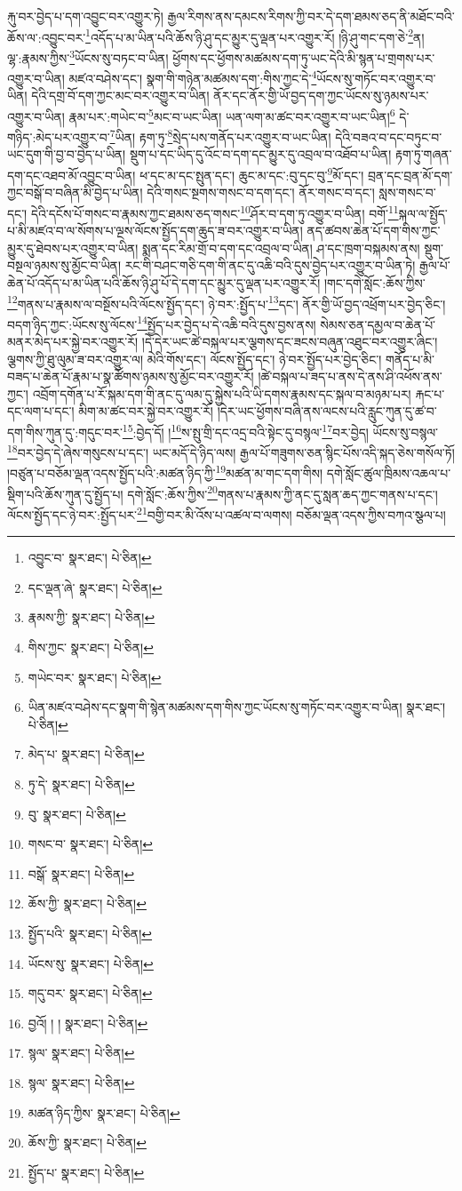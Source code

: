 རྐུ་བར་བྱེད་པ་དག་འབྱུང་བར་འགྱུར་ཏེ། རྒྱལ་རིགས་ནས་དམངས་རིགས་ཀྱི་བར་དེ་དག་ཐམས་ཅད་ནི་མཐོང་བའི་ཆོས་ལ་:འབྱུང་བར་\footnote{འབྱུང་བ་  སྣར་ཐང་།  པེ་ཅིན། }འདོད་པ་མ་ཡིན་པའི་ཆོས་ཉི་ཤུ་དང་མྱུར་དུ་ལྡན་པར་འགྱུར་རོ། །ཉི་ཤུ་གང་དག་ཅེ་\footnote{དང་ལྡན་ཞེ་  སྣར་ཐང་།  པེ་ཅིན། }ན། ལྷ་:རྣམས་ཀྱིས་\footnote{རྣམས་ཀྱི་  སྣར་ཐང་།  པེ་ཅིན། }ཡོངས་སུ་བཏང་བ་ཡིན། ཕྱོགས་དང་ཕྱོགས་མཚམས་དག་ཏུ་ཡང་དེའི་མི་སྙན་པ་གྲགས་པར་འགྱུར་བ་ཡིན། མཛའ་བཤེས་དང་། སྣག་གི་གཉེན་མཚམས་དག་:གིས་ཀྱང་དེ་\footnote{གིས་ཀྱང་  སྣར་ཐང་།  པེ་ཅིན། }ཡོངས་སུ་གཏོང་བར་འགྱུར་བ་ཡིན། དེའི་དགྲ་བོ་དག་ཀྱང་མང་བར་འགྱུར་བ་ཡིན། ནོར་དང་ནོར་གྱི་ཡོ་བྱད་དག་ཀྱང་ཡོངས་སུ་ཉམས་པར་འགྱུར་བ་ཡིན། རྣམ་པར་:གཡེང་བ་\footnote{གཡེང་བར་  སྣར་ཐང་།  པེ་ཅིན། }མང་བ་ཡང་ཡིན། ཡན་ལག་མ་ཚང་བར་འགྱུར་བ་ཡང་ཡིན།\footnote{ཡིན་མཛའ་བཤེས་དང་སྣག་གི་སྙེན་མཚམས་དག་གིས་ཀྱང་ཡོངས་སུ་གཏོང་བར་འགྱུར་བ་ཡིན།  སྣར་ཐང་།  པེ་ཅིན། } དེ་གཉིད་:མེད་པར་འགྱུར་བ་\footnote{མེད་པ་  སྣར་ཐང་།  པེ་ཅིན། }ཡིན། རྟག་ཏུ་\footnote{ཏུ་དེ་  སྣར་ཐང་།  པེ་ཅིན། }སྲེད་པས་གནོད་པར་འགྱུར་བ་ཡང་ཡིན། དེའི་བཟའ་བ་དང་བཏུང་བ་ཡང་དུག་གི་བྱ་བ་བྱེད་པ་ཡིན། སྡུག་པ་དང་ཡིད་དུ་འོང་བ་དག་དང་མྱུར་དུ་འབྲལ་བ་འཐོབ་པ་ཡིན། རྟག་ཏུ་གཞན་དག་དང་འཐབ་མོ་འབྱུང་བ་ཡིན། ཕ་དང་མ་དང་སྤུན་དང་། ཆུང་མ་དང་:བུ་དང་བུ་\footnote{བུ་  སྣར་ཐང་།  པེ་ཅིན། }མོ་དང་། བྲན་དང་བྲན་མོ་དག་ཀྱང་བསྒོ་བ་བཞིན་མི་བྱེད་པ་ཡིན། དེའི་གསང་སྔགས་གསང་བ་དག་དང་། ནོར་གསང་བ་དང་། སླས་གསང་བ་དང་། དེའི་དངོས་པོ་གསང་བ་རྣམས་ཀྱང་ཐམས་ཅད་གསང་\footnote{གསང་བ་  སྣར་ཐང་།  པེ་ཅིན། }ཤོར་བ་དག་ཏུ་འགྱུར་བ་ཡིན། བགོ་\footnote{བསྒོ་  སྣར་ཐང་།  པེ་ཅིན། }སྐལ་ལ་སྤྱོད་པ་མི་མཛའ་བ་ལ་སོགས་པ་ལྔས་ལོངས་སྤྱོད་དག་ཆུད་ཟ་བར་འགྱུར་བ་ཡིན། ནད་ཚབས་ཆེན་པོ་དག་གིས་ཀྱང་མྱུར་དུ་ཐེབས་པར་འགྱུར་བ་ཡིན། སྨན་དང་རིམ་གྲོ་བ་དག་དང་འབྲལ་བ་ཡིན། ཤ་དང་ཁྲག་བསྐམས་ནས། སྡུག་བསྔལ་ཉམས་སུ་མྱོང་བ་ཡིན། རང་གི་བཤང་གཅི་དག་གི་ནང་དུ་འཆི་བའི་དུས་བྱེད་པར་འགྱུར་བ་ཡིན་ཏེ། རྒྱལ་པོ་ཆེན་པོ་འདོད་པ་མ་ཡིན་པའི་ཆོས་ཉི་ཤུ་པོ་དེ་དག་དང་མྱུར་དུ་ལྡན་པར་འགྱུར་རོ། །གང་དགེ་སློང་:ཆོས་ཀྱིས་\footnote{ཆོས་ཀྱི་  སྣར་ཐང་།  པེ་ཅིན། }གནས་པ་རྣམས་ལ་བསྔོས་པའི་ལོངས་སྤྱོད་དང་། ཉེ་བར་:སྤྱོད་པ་\footnote{སྤྱོད་པའི་  སྣར་ཐང་།  པེ་ཅིན། }དང་། ནོར་གྱི་ཡོ་བྱད་འཕྲོག་པར་བྱེད་ཅིང་། བདག་ཉིད་ཀྱང་:ཡོངས་སུ་ལོངས་\footnote{ཡོངས་སུ་  སྣར་ཐང་།  པེ་ཅིན། }སྤྱོད་པར་བྱེད་པ་དེ་འཆི་བའི་དུས་བྱས་ནས། སེམས་ཅན་དམྱལ་བ་ཆེན་པོ་མནར་མེད་པར་སྐྱེ་བར་འགྱུར་རོ། །དེ་དེར་ཡང་ཚེ་བསྐལ་པར་ལྕགས་དང་ཟངས་བཞུན་འཐུང་བར་འགྱུར་ཞིང་། ལྕགས་ཀྱི་ཐུ་ལུམ་ཟ་བར་འགྱུར་ལ། མེའི་གོས་དང་། ལོངས་སྤྱོད་དང་། ཉེ་བར་སྤྱོད་པར་བྱེད་ཅིང་། གནོད་པ་མི་བཟད་པ་ཆེན་པོ་རྣམ་པ་སྣ་ཚོགས་ཉམས་སུ་མྱོང་བར་འགྱུར་རོ། །ཚེ་བསྐལ་པ་ཟད་པ་ནས་དེ་ནས་ཤི་འཕོས་ནས་ཀྱང་། འབྲོག་དགོན་པ་རོ་སྐམ་དག་གི་ནང་དུ་ལམ་དུ་སྐྱེས་པའི་ཡི་དགས་རྣམས་དང་སྐལ་བ་མཉམ་པར། རྐང་པ་དང་ལག་པ་དང་། མིག་མ་ཚང་བར་སྐྱེ་བར་འགྱུར་རོ། །དེར་ཡང་ཕྱོགས་བཞི་ནས་ལངས་པའི་རླུང་ཀུན་དུ་ཚ་བ་དག་གིས་ཀུན་དུ་:གདུང་བར་\footnote{གདུ་བར་  སྣར་ཐང་།  པེ་ཅིན། }:བྱེད་དོ། །\footnote{བྱའོ། ། །  སྣར་ཐང་།  པེ་ཅིན། }ས་སྤུ་གྲི་དང་འདྲ་བའི་སྟེང་དུ་བསྙལ་\footnote{སྙལ་  སྣར་ཐང་།  པེ་ཅིན། }བར་བྱེད། ཡོངས་སུ་བསྙལ་\footnote{སྙལ་  སྣར་ཐང་།  པེ་ཅིན། }བར་བྱེད་དེ་ཞེས་གསུངས་པ་དང་། ཡང་མདོ་དེ་ཉིད་ལས། རྒྱལ་པོ་གཟུགས་ཅན་སྙིང་པོས་འདི་སྐད་ཅེས་གསོལ་ཏོ། །བཙུན་པ་བཅོམ་ལྡན་འདས་སྤྱོད་པའི་:མཚན་ཉིད་ཀྱི་\footnote{མཚན་ཉིད་ཀྱིས་  སྣར་ཐང་།  པེ་ཅིན། }མཚན་མ་གང་དག་གིས། དགེ་སློང་ཚུལ་ཁྲིམས་འཆལ་པ་སྡིག་པའི་ཆོས་ཀུན་དུ་སྤྱོད་པ། དགེ་སློང་:ཆོས་ཀྱིས་\footnote{ཆོས་ཀྱི་  སྣར་ཐང་།  པེ་ཅིན། }གནས་པ་རྣམས་ཀྱི་ནང་དུ་སླན་ཆད་ཀྱང་གནས་པ་དང་། ལོངས་སྤྱོད་དང་ཉེ་བར་:སྤྱོད་པར་\footnote{སྤྱོད་པ་  སྣར་ཐང་།  པེ་ཅིན། }བགྱི་བར་མི་འོས་པ་འཚལ་བ་ལགས། བཅོམ་ལྡན་འདས་ཀྱིས་བཀའ་སྩལ་པ། 